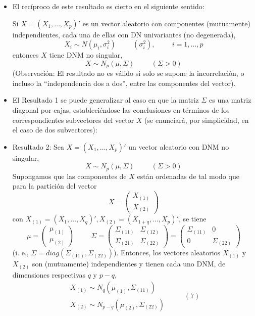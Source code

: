 \documentclass[11pt,a4paper]{article}
\begin{document}
\begin{itemize}
\begin{itemize}
\item El recíproco de este resultado es cierto en el siguiente sentido:

Si $X = (X_{1}, \dots, X_{p})'$ es un vector aleatorio con componentes (mutuamente) independientes, cada una de ellas con DN univariantes (no degenerada),
$$X_{i} \sim N(\mu_{i}, \sigma_{i}^{2}) \hspace{1cm} (\sigma_{i}^{2}), \hspace{1cm} i = 1, \dots, p$$
entonces $X$ tiene DNM no singular,
$$X \sim N_{p}(\mu, \Sigma) \hspace{1cm} (\Sigma > 0)$$
(Observación: El resultado no es válido si solo se supone la incorrelación, o incluso la ``independencia dos a dos'', entre las componentes del vector).

\item El Resultado 1 se puede generalizar al caso en que la matriz $\Sigma$ es una matriz diagonal por cajas, estableciéndose las conclusiones en términos de los correspondientes subvectores del vector $X$ (se enunciará, por simplicidad, en el caso de dos subvectores):

\item Resultado 2: Sea $X = (X_{1}, \dots, X_{p})'$ un vector aleatorio con DNM no singular,
$$X \sim N_{p}(\mu, \Sigma) \hspace{1cm} (\Sigma > 0)$$
Supongamos que las componentes de $X$ están ordenadas de tal modo que para la partición del vector
$$X = \begin{pmatrix} X_{(1)} \\ X_{(2)} \end{pmatrix}$$
con $X_{(1)} = (X_{1}, \dots, X_{q})', X_{(2)} = (X_{1+q}, \dots, X_{p})'$, se tiene
$$\mu = \begin{pmatrix} \mu_{(1)} \\ \mu_{(2)} \end{pmatrix} \hspace{1cm} \Sigma = \begin{pmatrix}
\Sigma_{(11)} & \Sigma_{(12)} \\
\Sigma_{(21)} & \Sigma_{(22)}
\end{pmatrix} = \begin{pmatrix}
\Sigma_{(11)} & 0 \\
0 & \Sigma_{(22)}
\end{pmatrix}$$
(i. e., $\Sigma = diag(\Sigma_{(11)}, \Sigma_{(22)})$). Entonces, los vectores aleatorios $X_{(1)}$ y $X_{(2)}$ son (mutuamente) independientes y tienen cada uno DNM, de dimensiones respectivas $q$ y $p-q$,
$$\begin{aligned} X_{(1)} \sim N_{q}(\mu_{(1)}, \Sigma_{(11)}) \\
X_{(2)} \sim N_{p-q}(\mu_{(2)}, \Sigma_{(22)}) \end{aligned} \hspace{1cm} (7)$$


\end{itemize}
\end{itemize}
\end{document}
